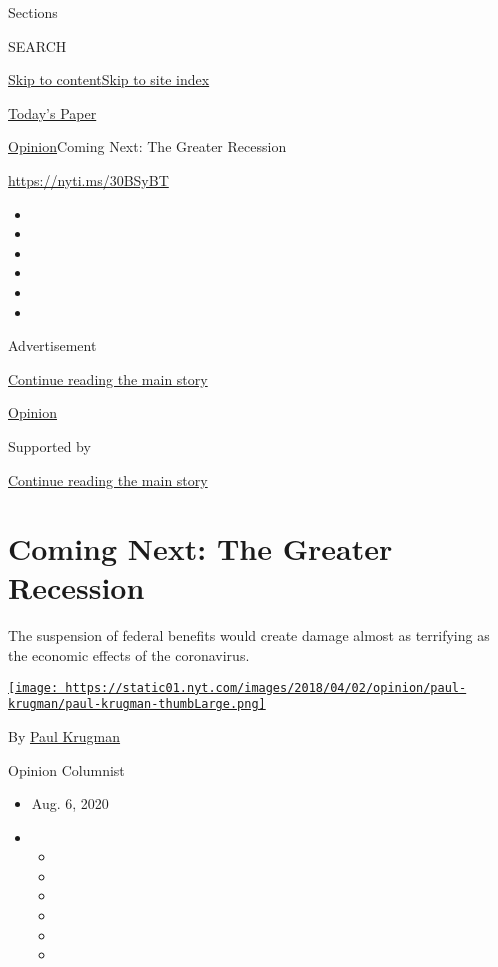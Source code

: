 Sections

SEARCH

\protect\hyperlink{site-content}{Skip to
content}\protect\hyperlink{site-index}{Skip to site index}

\href{https://myaccount.nytimes.com/auth/login?response_type=cookie\&client_id=vi}{}

\href{https://www.nytimes.com/section/todayspaper}{Today's Paper}

\href{/section/opinion}{Opinion}\textbar{}Coming Next: The Greater
Recession

\href{https://nyti.ms/30BSyBT}{https://nyti.ms/30BSyBT}

\begin{itemize}
\item
\item
\item
\item
\item
\item
\end{itemize}

Advertisement

\protect\hyperlink{after-top}{Continue reading the main story}

\href{/section/opinion}{Opinion}

Supported by

\protect\hyperlink{after-sponsor}{Continue reading the main story}

\hypertarget{coming-next-the-greater-recession}{%
\section{Coming Next: The Greater
Recession}\label{coming-next-the-greater-recession}}

The suspension of federal benefits would create damage almost as
terrifying as the economic effects of the coronavirus.

\href{https://www.nytimes.com/by/paul-krugman}{\texttt{[image: https://static01.nyt.com/images/2018/04/02/opinion/paul-krugman/paul-krugman-thumbLarge.png]}}

By \href{https://www.nytimes.com/by/paul-krugman}{Paul Krugman}

Opinion Columnist

\begin{itemize}
\item
  Aug. 6, 2020
\item
  \begin{itemize}
  \item
  \item
  \item
  \item
  \item
  \item
  \end{itemize}
\end{itemize}

